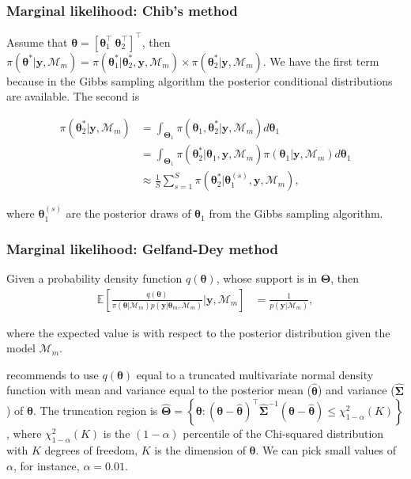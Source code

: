 \documentclass[12pt, compress]{beamer}
\begin{document}
\begin{frame}
	\frametitle{Marginal likelihood: Chib's method}
Assume that $\bm{\theta}=[\bm{\theta}^{\top}_1 \ \bm{\theta}^{\top}_2]^{\top}$, then $\pi(\bm{\theta}^*|\bm{y},\mathcal{M}_m)=\pi(\bm{\theta}^*_1|\bm{\theta}^*_2,\bm{y},\mathcal{M}_m)\times \pi(\bm{\theta}^*_2|\bm{y},\mathcal{M}_m)$. We have the first term because in the Gibbs sampling algorithm the posterior conditional distributions are available. The second is

\begin{align*}
	\pi(\bm{\theta}^*_2|\bm{y},\mathcal{M}_m)&=\int_{\bm{\Theta}_1}\pi(\bm{\theta}_1,\bm{\theta}^*_2|\bm{y},\mathcal{M}_m)d\bm{\theta}_1\\
	&=\int_{\bm{\Theta}_1}\pi(\bm{\theta}^*_2|\bm{\theta}_1,\bm{y},\mathcal{M}_m)\pi(\bm{\theta}_1|\bm{y},\mathcal{M}_m)d\bm{\theta}_1\\
	&\approx \frac{1}{S}\sum_{s=1}^S \pi(\bm{\theta}^*_2|\bm{\theta}^{(s)}_1,\bm{y},\mathcal{M}_m),
\end{align*} 

where $\bm{\theta}^{(s)}_1$ are the posterior draws of $\bm{\theta}_1$ from the Gibbs sampling algorithm. 
 
\end{frame}

\begin{frame}
	\frametitle{Marginal likelihood: Gelfand-Dey method}
Given a probability density function $q(\bm{\theta})$, whose support is in $\bm{\Theta}$, then
\begin{align*}
	\mathbb{E}\left[\frac{q(\bm{\theta})}{\pi(\bm{\theta}|\mathcal{M}_m)p(\bm{y}|\bm{\theta}_m,\mathcal{M}_m)}\biggr\rvert \bm{y},\mathcal{M}_m\right]&=\frac{1}{p(\bm{y}|\mathcal{M}_m)},
\end{align*} 

where the expected value is with respect to the posterior distribution given the model $\mathcal{M}_m$.

\cite{geweke1999using} recommends to use $q(\bm{\theta})$ equal to a truncated multivariate normal density function with mean and variance equal to the posterior mean ($\hat{\bm{\theta}}$) and variance ($\hat{\bm{\Sigma}}$) of $\bm{\theta}$. The truncation region is $\hat{\bm{\Theta}}=\left\{\bm{\theta}:(\bm{\theta}-\hat{\bm{\theta}})^{\top}\hat{\bm{\Sigma}}^{-1}(\bm{\theta}-\hat{\bm{\theta}})\leq \chi_{1-\alpha}^2(K)\right\}$, where $\chi_{1-\alpha}^2(K)$ is the $(1-\alpha)$ percentile of the Chi-squared distribution with $K$ degrees of freedom, $K$ is the dimension of $\bm{\theta}$. We can pick small values of $\alpha$, for instance, $\alpha=0.01$.
\end{frame}
\end{document}
